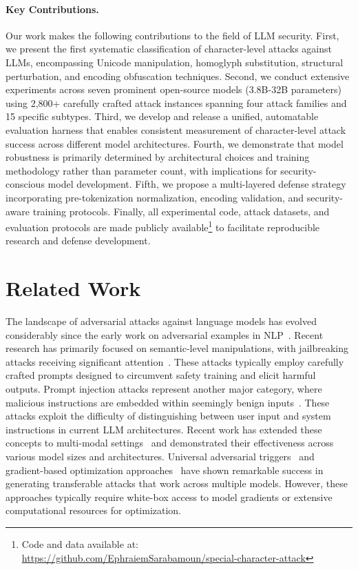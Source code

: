 \documentclass[11pt]{article}
\begin{document}
\begin{multicols}{2}
\paragraph{Key Contributions.} Our work makes the following contributions to the field of LLM security. First, we present the first systematic classification of character-level attacks against LLMs, encompassing Unicode manipulation, homoglyph substitution, structural perturbation, and encoding obfuscation techniques. Second, we conduct extensive experiments across seven prominent open-source models (3.8B-32B parameters) using 2,800+ carefully crafted attack instances spanning four attack families and 15 specific subtypes. Third, we develop and release a unified, automatable evaluation harness that enables consistent measurement of character-level attack success across different model architectures. Fourth, we demonstrate that model robustness is primarily determined by architectural choices and training methodology rather than parameter count, with implications for security-conscious model development. Fifth, we propose a multi-layered defense strategy incorporating pre-tokenization normalization, encoding validation, and security-aware training protocols. Finally, all experimental code, attack datasets, and evaluation protocols are made publicly available\footnote{Code and data available at: \url{https://github.com/EphraiemSarabamoun/special-character-attack}} to facilitate reproducible research and defense development.

\section{Related Work}

The landscape of adversarial attacks against language models has evolved considerably since the early work on adversarial examples in NLP~\citep{jia2017adversarial,ebrahimi2017hotflip}. Recent research has primarily focused on semantic-level manipulations, with jailbreaking attacks receiving significant attention~\citep{wei2023jailbroken,zou2023universal,liu2023autodan}. These attacks typically employ carefully crafted prompts designed to circumvent safety training and elicit harmful outputs. Prompt injection attacks represent another major category, where malicious instructions are embedded within seemingly benign inputs~\citep{greshake2023not,perez2022ignore}. These attacks exploit the difficulty of distinguishing between user input and system instructions in current LLM architectures. Recent work has extended these concepts to multi-modal settings~\citep{bagdasaryan2023ab} and demonstrated their effectiveness across various model sizes and architectures. Universal adversarial triggers~\citep{wallace2019universal} and gradient-based optimization approaches~\citep{zou2023universal} have shown remarkable success in generating transferable attacks that work across multiple models. However, these approaches typically require white-box access to model gradients or extensive computational resources for optimization.


\end{multicols}
\end{document}
